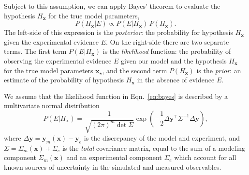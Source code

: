 \documentclass[aps,prc,reprint,amsmath,nofootinbib]{revtex4-1}
\newcommand{\x}{\mathbf x}
\newcommand{\y}{\mathbf y}
\begin{document}
Subject to this assumption, we can apply Bayes' theorem to evaluate the hypothesis $H_\x$ for the true model parameters,
\begin{equation}
  \label{eq:bayes}
  P(H_\x | E) \propto P(E | H_\x)\, P(H_\x).
\end{equation}
The left-side of this expression is the \emph{posterior}: the probability for hypothesis $H_\x$ given the experimental evidence $E$.
On the right-side there are two separate terms.
The first term $P(E | H_\x)$ is the \emph{likelihood} function: the probability of observing the experimental evidence $E$ given our model and the hypothesis $H_\x$ for the true model parameters $\x_\star$, and the second term $P(H_\x)$ is the \emph{prior}: an estimate of the probability of hypothesis $H_\x$ in the absence of evidence $E$.

We assume that the likelihood function in Eqn.~\eqref{eq:bayes} is described by a multivariate normal distribution
\begin{equation}
  \label{eq:likelihood}
  P(E | H_\x) = \frac{1}{\sqrt{(2\pi)^m \det \Sigma}} \exp \left ( -\frac{1}{2}\Delta\y^\intercal \Sigma^{-1} \Delta\y \right ),
\end{equation}
where $\Delta\y = \y_m(\x) - \y_e$ is the discrepancy of the model and experiment, and $\Sigma = \Sigma_m(\x) + \Sigma_e$ is the \emph{total} covariance matrix, equal to the sum of a modeling component $\Sigma_m(\x)$ and an experimental component $\Sigma_e$ which account for all known sources of uncertainty in the simulated and measured observables.
\end{document}

